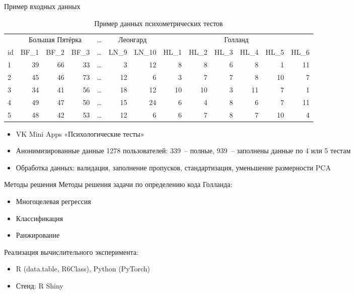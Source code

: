 \documentclass[english,russian, 10pt]{beamer}
\begin{document}
\begin{frame}{Пример входных данных}
    \begingroup
      \fontsize{7pt}{9pt}\selectfont
        \begin{table}[ht]
            \centering
            \caption{Пример данных психометрических тестов}
            \label{tab:input_test_data}
            \begin{tabular}{l|rrrr rr|rrrrrr}
                \toprule
                & \multicolumn{3}{c}{Большая Пятёрка}
                & \multicolumn{1}{c}{\dots}
                & \multicolumn{2}{c}{Леонгард}
                & \multicolumn{6}{c}{Голланд} \\
                \cmidrule(lr){2-4} \cmidrule(lr){5-5} \cmidrule(lr){6-7} \cmidrule(lr){8-13}
                id 
                & BF\_1 & BF\_2 & BF\_3 
                & \dots 
                & LN\_9 & LN\_10 
                & HL\_1 & HL\_2 & HL\_3 & HL\_4 & HL\_5 & HL\_6 \\
                \midrule
                1 & 39 & 66 & 33 & \dots &  3 & 12  &  8 &  8 &  6 &  8 &  1 & 11 \\
                2 & 45 & 46 & 73 & \dots & 12 &  6  &  3 &  7 &  7 &  8 & 10 &  7 \\
                3 & 34 & 41 & 56 & \dots & 18 & 12  & 10 & 10 &  3 & 11 &  7 &  1 \\
                4 & 49 & 47 & 50 & \dots & 15 & 24  &  6 &  4 &  8 &  6 &  7 & 11 \\
                5 & 48 & 42 & 53 & \dots & 12 &  6  &  6 &  7 &  8 &  7 & 10 &  4 \\
                \bottomrule
            \end{tabular}
        \end{table}
    \endgroup

    \begin{itemize}
        \item VK Mini Apps «Психологические тесты»
        \item Анонимизированные данные 1278 пользователей: 339~-- полные, 939~-- заполнены данные по 4 или 5 тестам
        \item Обработка данных: валидация, заполнение пропусков, стандартизация, уменьшение размерности PCA
    \end{itemize}
\end{frame}


\begin{frame}{Методы решения}
    Методы решения задачи по определению кода Голланда:
    \begin{itemize}
        \item Многоцелевая регрессия
        \item Классификация
        \item Ранжирование
    \end{itemize}
    \vspace{0.3em}
    Реализация вычислительного эксперимента:
    \begin{itemize}
        \item R (data.table, R6Class), Python (PyTorch)
        \item Стенд: R Shiny
    \end{itemize}
\end{frame}
\end{document}
